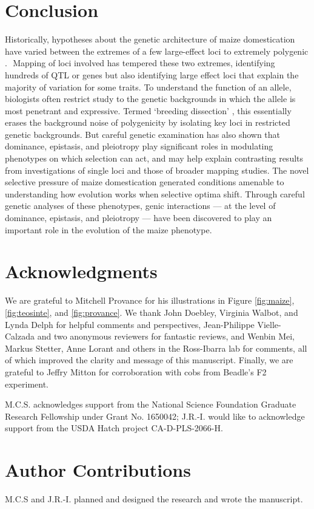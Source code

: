 \documentclass[9pt,twocolumn,twoside]{rilabRxiv}
\begin{document}
\section*{Conclusion}

﻿Historically, hypotheses about the genetic architecture of maize domestication have varied between the extremes of a few large-effect loci \citep{beadle1939, mangelsdorf1939} to extremely polygenic \citep{iltis1983}.
﻿ Mapping of loci involved has tempered these two extremes, identifying hundreds of QTL \citep{briggs2007} or genes \citep{wright2005, hufford2012natgen} but also identifying large effect loci that explain the majority of variation for some traits.
To understand the function of an allele,  biologists often restrict study to the genetic backgrounds in which the allele is most penetrant and expressive.
Termed `breeding dissection' \citep{wilkes2004}, this essentially erases the background noise of polygenicity by isolating key loci in restricted genetic backgrounds.
﻿But careful genetic examination has also shown that dominance, epistasis, and pleiotropy play significant roles in modulating phenotypes on which selection can act, and may help explain contrasting results from investigations of single loci and those of broader mapping studies.
﻿The novel selective pressure of maize domestication generated conditions amenable to understanding how evolution works when selective optima shift.
Through careful genetic analyses of these phenotypes, genic interactions --- at the level of dominance, epistasis, and pleiotropy --- have been discovered to play an important role in the evolution of the maize phenotype.


 \section*{Acknowledgments}
﻿We are grateful to Mitchell Provance for his illustrations in Figure \ref{fig:maize}, \ref{fig:teosinte}, and \ref{fig:provance}.
We thank John Doebley, Virginia Walbot, and Lynda Delph for helpful comments and perspectives, Jean-Philippe Vielle-Calzada and two anonymous reviewers for fantastic reviews, and Wenbin Mei, Markus Stetter, Anne Lorant and others in the Ross-Ibarra lab for comments, all of which improved the clarity and message of this manuscript.
﻿Finally, we are grateful to Jeffry Mitton for corroboration with cobs from Beadle's F2 experiment.

M.C.S. acknowledges support from the National Science Foundation Graduate Research Fellowship under Grant No. 1650042; J.R.-I. would like to acknowledge support from the USDA Hatch project CA-D-PLS-2066-H.

\section*{Author Contributions}
M.C.S and J.R.-I. planned and designed the research and wrote the manuscript.

 
 
\end{document}
